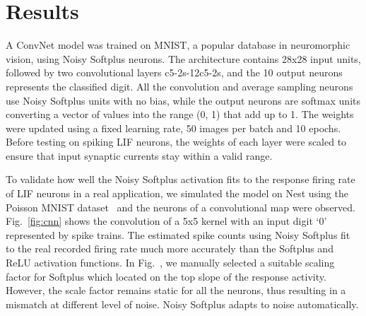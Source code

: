 \documentclass[runningheads,a4paper]{llncs}
\begin{document}
	\section{Results}
	A ConvNet model was trained on MNIST,
	a popular database in neuromorphic vision, using Noisy Softplus neurons.
	The architecture contains 28x28 input units, followed by two convolutional layers c5-2s-12c5-2s, and the 10 output neurons represents the classified digit.
	All the convolution and average sampling neurons use Noisy Softplus units with no bias, while the output neurons are softmax units converting a vector of values into the range (0, 1) that add up to 1.
	The weights were updated using a fixed learning rate, 50 images per batch and 10 epochs.
	Before testing on spiking LIF neurons, the weights of each layer were scaled to ensure that input synaptic currents stay within a valid range.
	
	To validate how well the Noisy Softplus activation fits to the response firing rate of LIF neurons in a real application, we simulated the model on Nest using the Poisson MNIST dataset~\cite{liu2016bench} and the neurons of a convolutional map were observed.
	Fig.~\ref{fig:cnn} shows the convolution of a 5x5 kernel with an input digit `0' represented by spike trains.
	The estimated spike counts using Noisy Softplus fit to the real recorded firing rate much more accurately than the Softplus and ReLU activation functions.
	In Fig.~, we manually selected a suitable scaling factor for Softplus which located on the top slope of the response activity.
	However, the scale factor remains static for all the neurons, thus resulting in a mismatch at different level of noise.
	Noisy Softplus adapts to noise automatically.
	

	
	
\end{document}
